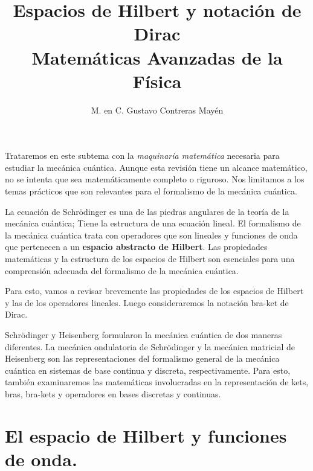 
\title{Espacios de Hilbert y notación de Dirac \\ \large {Matemáticas Avanzadas de la Física}  \vspace{-3ex}}

\author{M. en C. Gustavo Contreras Mayén}
\date{ }

\pagestyle{fancy}
\fancyhf{}
\lhead{\leftmark}
\rfoot{\thepage}
\setlength{\headheight}{16pt}%



\maketitle
\fontsize{14}{14}\selectfont
\tableofcontents
\newpage

Trataremos en este subtema con la \emph{maquinaria matemática} necesaria para estudiar la mecánica cuántica. Aunque esta revisión tiene un alcance matemático, no se intenta que sea matemáticamente completo o riguroso. Nos limitamos a los temas prácticos que son relevantes para el formalismo de la mecánica cuántica.
\par
La ecuación de Schrödinger es una de las piedras angulares de la teoría de la mecánica cuántica; Tiene la estructura de una ecuación lineal. El formalismo de la mecánica cuántica trata con operadores que son lineales y funciones de onda que pertenecen a un \textbf{espacio abstracto de Hilbert}. Las propiedades matemáticas y la estructura de los espacios de Hilbert son esenciales para una comprensión adecuada del formalismo de la mecánica cuántica.
\par
Para esto, vamos a revisar brevemente las propiedades de los espacios de Hilbert y las de los operadores lineales. Luego consideraremos la notación bra-ket de Dirac.
\par
Schrödinger y Heisenberg formularon la mecánica cuántica de dos maneras diferentes. La mecánica ondulatoria de Schrödinger y la mecánica matricial de Heisenberg son las representaciones del formalismo general de la mecánica cuántica en sistemas de base continua y discreta, respectivamente. Para esto, también examinaremos las matemáticas involucradas en la representación de kets, bras, bra-kets y operadores en bases discretas y continuas.
\section{El espacio de Hilbert y funciones de onda.}
